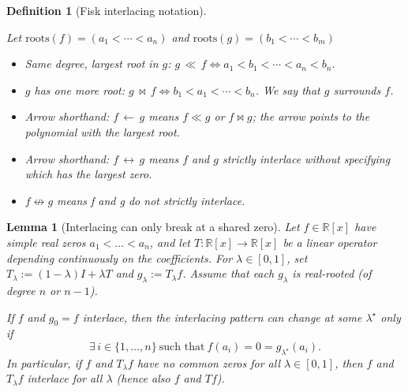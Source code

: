 \documentclass[11pt]{article}
\theoremstyle{breakdef}
\newtheorem{lemma}[theorem]{Lemma}
\newtheorem{definition}[theorem]{Definition}
\newcommand{\interls}{\ll}
\newcommand{\interlarrow}{\longleftarrow}
\begin{document}
\begin{definition}[Fisk interlacing notation]
\label{sec:fisk-interlacing}

Let $\mathrm{roots}(f)=(a_1 < \cdots < a_n)$ and $\mathrm{roots}(g)=(b_1 < \cdots < b_m)$

\begin{itemize}
\item Same degree, largest root in $g$: $g\,\interls\,f \iff a_1<b_1<\cdots<a_n<b_n$.
\item $g$ has one more root: $g\,\bowtie \,f \iff b_1<a_1<\cdots<b_n$.  We say that $g$ surrounds $f$.
\item Arrow shorthand: $f\,\interlarrow\,g$ means $f\interls g$ or $f \bowtie g$; the arrow points to the polynomial with the largest root.

\item Arrow shorthand: $f\,\leftrightarrow \,g$ means $f$ and $g$ strictly interlace without specifying which has the largest zero.

\item $f \not\leftrightarrow g$ means f and g do not strictly interlace.

\end{itemize}
\end{definition}

\begin{lemma}[Interlacing can only break at a shared zero]\label{prop:no-break}
Let $f\in\mathbb R[x]$ have simple real zeros $a_1<\dots<a_n$, and let $T:\mathbb R[x]\to\mathbb R[x]$ be a linear operator depending continuously on the coefficients.
For $\lambda\in[0,1]$, set $T_\lambda := (1-\lambda)I + \lambda T$ and $g_\lambda := T_\lambda f$.
Assume that each $g_\lambda$ is real-rooted (of degree $n$ or $n-1$).

If $f$ and $g_0=f$ interlace, then the interlacing pattern can change at some $\lambda^\star$ only if
\[
\exists\,i\in\{1,\dots,n\}\ \text{such that}\ f(a_i)=0=g_{\lambda^\star}(a_i).
\]
In particular, if $f$ and $T_\lambda f$ have no common zeros for all $\lambda\in[0,1]$, then $f$ and $T_\lambda f$ interlace for all $\lambda$ (hence also $f$ and $Tf$).
\end{lemma}
\end{document}
